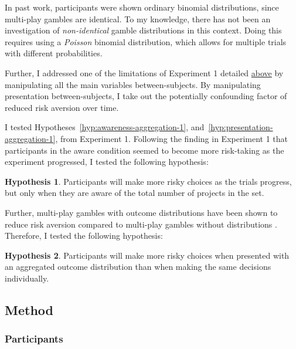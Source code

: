 \documentclass[a4paper, nobind, dvipsnames]{templates/ociamthesis}
\theoremstyle{definition}
\theoremstyle{definition}
\theoremstyle{definition}
\theoremstyle{definition}
\newtheorem{hypothesis}{Hypothesis}[chapter]
\theoremstyle{remark}
\begin{document}
In past work, participants were shown ordinary binomial distributions, since
multi-play gambles are identical. To my knowledge, there has not been an
investigation of \emph{non-identical} gamble distributions in this context. Doing
this requires using a \emph{Poisson} binomial distribution, which allows for multiple
trials with different probabilities.

Further, I addressed one of the limitations of Experiment 1 detailed
\protect\hyperlink{discussion-aggregation-1}{above} by manipulating all the main variables
between-subjects. By manipulating presentation between-subjects, I take out the
potentially confounding factor of reduced risk aversion over time.

I tested Hypotheses~\ref{hyp:awareness-aggregation-1},
and~\ref{hyp:presentation-aggregation-1}, from Experiment 1. Following the
finding in Experiment 1 that participants in the aware condition seemed to
become more risk-taking as the experiment progressed, I tested the following
hypothesis:

\begin{hypothesis}
\protect\hypertarget{hyp:awareness-trials-aggregation-2}{}{\label{hyp:awareness-trials-aggregation-2} }Participants will make more risky choices as the trials progress, but only when
they are aware of the total number of projects in the set.
\end{hypothesis}

Further, multi-play gambles with outcome distributions have been shown to reduce
risk aversion compared to multi-play gambles without distributions \autocites[e.g.,][]{redelmeier1992,webb2017}. Therefore, I tested the following hypothesis:

\begin{hypothesis}
\protect\hypertarget{hyp:distribution-aggregation-2}{}{\label{hyp:distribution-aggregation-2} }Participants will make more risky choices when presented with an aggregated
outcome distribution than when making the same decisions individually.
\end{hypothesis}

\subsection{Method}

\subsubsection{Participants}
\end{document}
